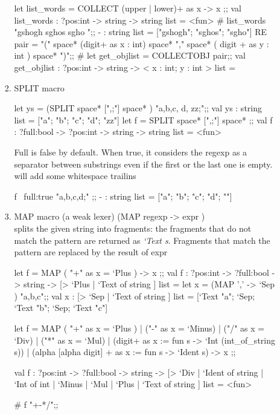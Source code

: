 \begin{enumerate}
\begin{enumerate}[(a)]
\begin{enumerate}
\begin{alternate}
let list_words = COLLECT (upper | lower)+ as x -> x ;;
val list_words : ?pos:int -> string -> string list = <fun>
# list_words "gshogh sghos sgho ";;
- : string list = ["gshogh"; "sghos"; "sgho"]
RE pair = "(" space* (digit+ as x : int) space* ","  space* ( digit + as y : int ) space* ")";;
 # let get_objlist = COLLECTOBJ pair;;
val get_objlist : ?pos:int -> string -> < x : int; y : int > list =
  \end{alternate}  
\item SPLIT macro
  \begin{alternate}
let ys = (SPLIT space* [",;"] space* ) "a,b,c, d, zz;";;
val ys : string list = ["a"; "b"; "c"; "d"; "zz"]
let f = SPLIT space* [",;"] space* ;;
val f : ?full:bool -> ?pos:int -> string -> string list = <fun>
\end{alternate}

Full is false by default. When true, it considers the regexp
as a separator between substrings even if the first or the last one
is empty. will add some whitespace trailins
\begin{alternate}
f ~full:true "a,b,c,d;"  ;;
- : string list = ["a"; "b"; "c"; "d"; ""]
\end{alternate}
\item MAP macro (a weak lexer) (MAP regexp -> expr ) \\
  splits the given string into fragments: the fragments that do not match the pattern are returned as \textit{`Text s}. Fragments that match the pattern are replaced by the result of expr 

\begin{alternate}
let f = MAP ( "+" as x = `Plus ) -> x ;;
val f : ?pos:int -> ?full:bool -> string -> [> `Plus | `Text of string ] list =
let x =  (MAP ',' -> `Sep ) "a,b,c";;
val x : [> `Sep | `Text of string ] list = [`Text "a"; `Sep; `Text "b"; `Sep; `Text "c"]
\end{alternate}

\begin{ocamlcode}
let f = MAP ( "+" as x = `Plus ) | ("-" as x = `Minus) | ("/" as x = `Div)
  | ("*" as x = `Mul) | (digit+ as x := fun s -> `Int (int_of_string s)) 
  | (alpha [alpha digit] +  as x := fun s -> `Ident s) -> x ;;
\end{ocamlcode}

\begin{ocamlcode}
val f :
  ?pos:int ->
  ?full:bool ->
  string ->
  [> `Div
   | `Ident of string
   | `Int of int
   | `Minus
   | `Mul
   | `Plus
   | `Text of string ]
list = <fun>
\end{ocamlcode}
\begin{ocamlcode}
# f "+-*/";;
\end{ocamlcode}


\end{enumerate}
\end{enumerate}
\end{enumerate}
